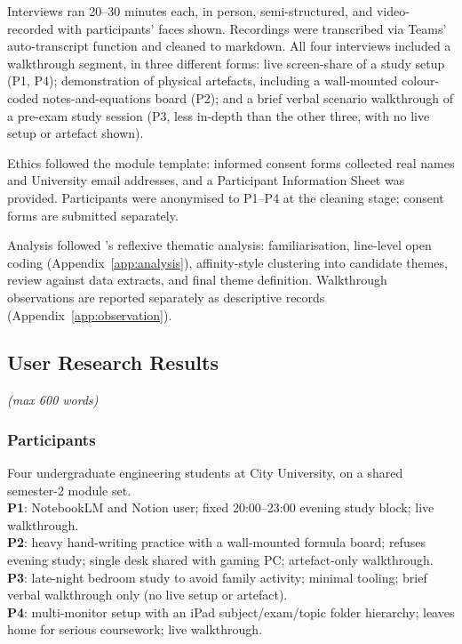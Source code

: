 \documentclass[a4paper,11pt]{article}
\newcommand{\wclimit}[1]{\hfill\textit{\footnotesize(max #1 words)}}
\begin{document}
Interviews ran 20--30 minutes each, in person, semi-structured, and
video-recorded with participants' faces shown. Recordings were
transcribed via Teams' auto-transcript function and cleaned to
markdown. All four interviews included a walkthrough segment, in
three different forms: live screen-share of a study setup (P1, P4);
demonstration of physical artefacts, including a wall-mounted
colour-coded notes-and-equations board (P2); and a brief verbal
scenario walkthrough of a pre-exam study session (P3, less in-depth
than the other three, with no live setup or artefact shown).

Ethics followed the module template: informed consent forms
collected real names and University email addresses, and a
Participant Information Sheet was provided. Participants were
anonymised to P1--P4 at the cleaning stage; consent forms are
submitted separately.

Analysis followed \textcite{braun2006}'s reflexive thematic
analysis: familiarisation, line-level open coding
(Appendix~\ref{app:analysis}), affinity-style clustering into
candidate themes, review against data extracts, and final theme
definition. Walkthrough observations are reported separately as
descriptive records (Appendix~\ref{app:observation}).
\subsection{User Research Results}\label{sec:results}
\wclimit{600}

\subsubsection*{Participants}

Four undergraduate engineering students at City University, on
a shared semester-2 module set.\\ \textbf{P1}: NotebookLM and Notion
user; fixed 20:00--23:00 evening study block; live walkthrough.
\\ \textbf{P2}: heavy hand-writing practice with a wall-mounted formula
board; refuses evening study; single desk shared with gaming PC;
artefact-only walkthrough.\\ \textbf{P3}: late-night bedroom study to
avoid family activity; minimal tooling; brief verbal walkthrough
only (no live setup or artefact).
\\ \textbf{P4}: multi-monitor setup with an iPad subject/exam/topic
folder hierarchy; leaves home for serious coursework; live walkthrough.
\end{document}
